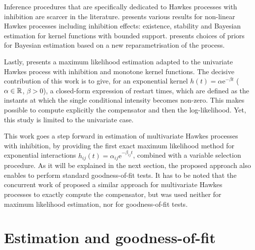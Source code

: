     Inference procedures that are specifically dedicated to Hawkes processes with inhibition are scarcer in the literature. \textcite{Sulem2024} presents various results for non-linear Hawkes processes including inhibition effects: existence, stability and Bayesian estimation for kernel functions with bounded support.
    \textcite{Deutsch2022} presents choices of priors for Bayesian estimation based on a new reparametrisation of the process.

    Lastly, \textcite{bonnet2021} presents a maximum likelihood estimation adapted to the univariate Hawkes process with inhibition and monotone kernel functions.
    The decisive contribution of this work is to give, for an exponential kernel \(h(t) = \alpha \mathrm{e}^{-\beta t}\) (\(\alpha \in {\mathbb R}\), \(\beta>0\)), a closed-form expression of restart times, which are defined as the instants at which the single conditional intensity becomes non-zero.
    This makes possible to compute explicitly the compensator and then the log-likelihood.
    Yet, this study is limited to the univariate case.

    This work goes a step forward in estimation of multivariate Hawkes processes with inhibition, by providing the first exact maximum likelihood method for exponential interactions $h_{ij}(t) = \alpha_{ij}\mathrm{e}^{-\beta_{ij}t}$, combined with a variable selection procedure. As it will be explained in the next section, the proposed approach also enables to perform standard goodness-of-fit tests. It has to be noted that the concurrent work of \textcite{Deutsch2022} proposed a similar approach for multivariate Hawkes processes to exactly compute the compensator,
    but was used neither for maximum likelihood estimation, nor for goodness-of-fit tests.


    \section{Estimation and goodness-of-fit}\label{sec:chap3_exponential}

